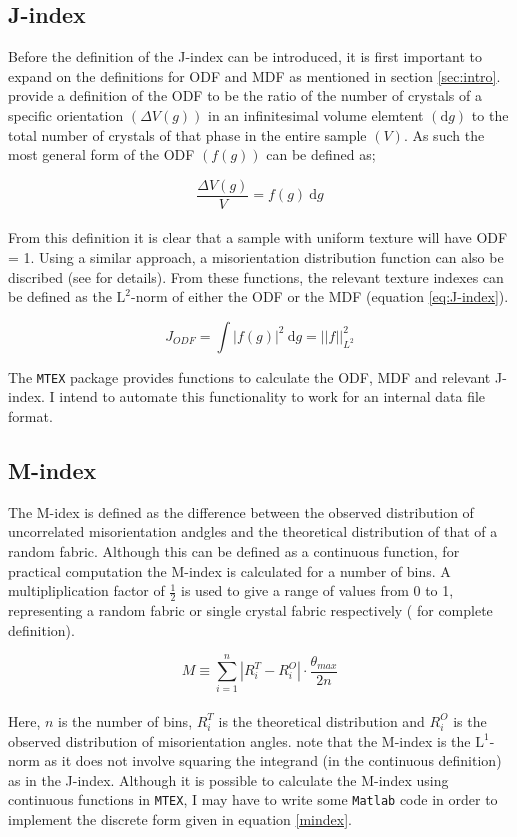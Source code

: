\documentclass[a4paper,11pt]{article}
\numberwithin{equation}{section}
\begin{document}
\subsection{J-index}
Before the definition of the J-index can be introduced, it is first important to expand on the definitions for ODF and MDF as 
mentioned in section \ref{sec:intro}. \cite{Mainprice} provide a definition of the ODF to be the ratio of the number of crystals
of a specific orientation $(\Delta{V(g)})$ in an infinitesimal volume elemtent $(\mathrm{d}g)$ to the total number of crystals of that phase 
in the entire sample $(V)$. As such the most general form of the ODF $(f(g))$ can be defined as;

\begin{equation}
\frac{\Delta{V(g)}}{V} = f(g)\ \mathrm{d}g
\end{equation}
\\
From this definition it is clear that a sample with uniform texture will have ODF = 1. Using a similar approach, a misorientation distribution function can also be discribed (see \cite{Mainprice} for details). From these functions, the relevant texture indexes 
can be defined as the $\mathrm{L^2}$-norm of either the ODF or the MDF (equation \ref{eq:J-index}).

\begin{equation}
 J_{ODF} = \int |f(g)|^2\ \mathrm{d}g = ||f||^2_{L^2}
 \label{eq:J-index}
\end{equation}

The \texttt{MTEX} package provides functions to calculate the ODF, MDF and relevant J-index. I intend to automate this functionality to work for an internal data file format. 

\subsection{M-index}
The M-idex is defined as the difference between the observed distribution of uncorrelated misorientation 
andgles and the theoretical distribution of that of a random fabric. Although this can be defined as a continuous function, 
for practical computation the M-index is calculated for a number of bins. A multipliplication factor of $\frac{1}{2}$ is used
to give a range of values from 0 to 1, representing a random fabric or single crystal fabric respectively (\cite{Skemer} for
complete definition). 

\begin{equation} \label{mindex}
M \equiv \sum_{i=1}^{n} | R^{T}_{i} - R^{O}_{i} | \cdot \frac{\theta_{max}}{2n} 
\end{equation}
\\
Here, $n$ is the number of bins, $R^{T}_{i}$ is the theoretical distribution and $R^{O}_{i}$ is the observed distribution
of misorientation angles. \cite{Mainprice} note that the M-index is the $\mathrm{L^1}$-norm as it does not involve squaring the
integrand (in the continuous definition) as in the J-index. Although it is possible to calculate the M-index 
using continuous functions in \texttt{MTEX}, I may have to write some \texttt{Matlab} code in order to implement the discrete form given in equation \ref{mindex}.
\end{document}
